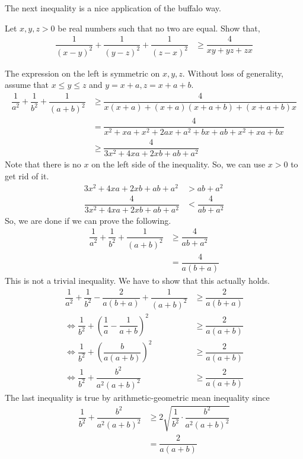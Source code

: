 \documentclass{subfile}
\begin{document}
	The next inequality is a nice application of the buffalo way.
		\begin{problem}
			Let $x,y,z>0$ be real numbers such that no two are equal. Show that,
				\begin{align*}
					\dfrac{1}{(x-y)^2}+\dfrac{1}{(y-z)^2}+\dfrac{1}{(z-x)^2}
						& \geq\dfrac{4}{xy+yz+zx}
				\end{align*}
		\end{problem}
	
		\begin{solution}
			The expression on the left is symmetric on $x,y,z$. Without loss of generality, assume that $x\leq y\leq z$ and $y=x+a,z=x+a+b$.
				\begin{align*}
					\dfrac{1}{a^2}+\dfrac{1}{b^2}+\dfrac{1}{(a+b)^2}
						& \geq\dfrac{4}{x(x+a)+(x+a)(x+a+b)+(x+a+b)x}\\
						& = \dfrac{4}{x^2+xa+x^2+2ax+a^2+bx+ab+x^2+xa+bx}\\
						& \geq \dfrac{4}{3x^2+4xa+2xb+ab+a^2}
				\end{align*}
			Note that there is no $x$ on the left side of the inequality. So, we can use $x>0$ to get rid of it.
				\begin{align*}
					3x^2+4xa+2xb+ab+a^2
						& > ab+a^2\\
					\dfrac{4}{3x^2+4xa+2xb+ab+a^2}
						& <\dfrac{4}{ab+a^2}
				\end{align*}
			So, we are done if we can prove the following.
				\begin{align*}
					\dfrac{1}{a^2}+\dfrac{1}{b^2}+\dfrac{1}{(a+b)^2}
						& \geq\dfrac{4}{ab+a^2}\\
						& = \dfrac{4}{a(b+a)}
				\end{align*}
			This is not a trivial inequality. We have to show that this actually holds.
				\begin{align*}
					\dfrac{1}{a^2}+\dfrac{1}{b^2}-\dfrac{2}{a(b+a)}+\dfrac{1}{(a+b)^2}
						& \geq\dfrac{2}{a(b+a)}\\
					\iff\dfrac{1}{b^2}+\left(\dfrac{1}{a}-\dfrac{1}{a+b}\right)^2
						& \geq\dfrac{2}{a(a+b)}\\
					\iff\dfrac{1}{b^2}+\left(\dfrac{b}{a(a+b)}\right)^2
						& \geq\dfrac{2}{a(a+b)}\\
					\iff\dfrac{1}{b^2}+\dfrac{b^2}{a^2(a+b)^2}
						& \geq\dfrac{2}{a(a+b)}
				\end{align*}
			The last inequality is true by arithmetic-geometric mean inequality since
				\begin{align*}
					\dfrac{1}{b^2}+\dfrac{b^2}{a^2(a+b)^2}
						& \geq2\sqrt{\dfrac{1}{b^2}\cdot\dfrac{b^2}{a^2(a+b)^2}}\\
						& = \dfrac{2}{a(a+b)}
				\end{align*}
		\end{solution}
\end{document}
